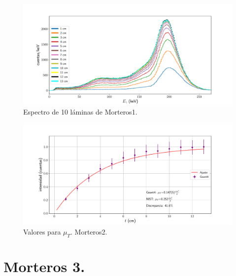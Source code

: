  
\begin{figure}[H]
	\centering
	\includegraphics[width=1.0\linewidth]{Kap4/espectro_m2.pdf}
	\caption{Espectro de 10 láminas de Morteros1.}
	\label{fig:espectrom2}
\end{figure}
 
\begin{figure}[H]
	\centering
	\includegraphics[width=1.0\linewidth]{Kap4/mu_T-m2.pdf}
	\caption{Valores para $\mu_T$. Morteros2.}
	\label{fig:mut-m2}
\end{figure}
 
 
 
 \section{Morteros 3.}
 
